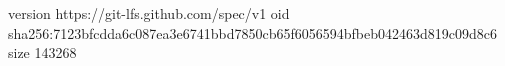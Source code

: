 version https://git-lfs.github.com/spec/v1
oid sha256:7123bfcdda6c087ea3e6741bbd7850cb65f6056594bfbeb042463d819c09d8c6
size 143268
